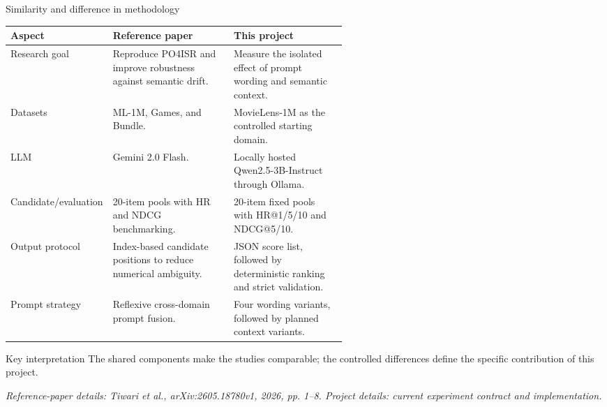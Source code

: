 \documentclass[aspectratio=169,12pt]{beamer}
\newcommand{\source}[1]{\vspace{0.35em}\par{\tiny\color{Muted}\textit{#1}}}
\begin{document}
\begin{frame}{Similarity and difference in methodology}
\scriptsize
\begin{tabularx}{\linewidth}{@{}p{0.20\linewidth}p{0.36\linewidth}X@{}}
\toprule
\textbf{Aspect} & \textbf{Reference paper} & \textbf{This project}\\
\midrule
Research goal & Reproduce PO4ISR and improve robustness against semantic drift. & Measure the isolated effect of prompt wording and semantic context.\\[0.35em]
Datasets & ML-1M, Games, and Bundle. & MovieLens-1M as the controlled starting domain.\\[0.35em]
LLM & Gemini 2.0 Flash. & Locally hosted Qwen2.5-3B-Instruct through Ollama.\\[0.35em]
Candidate/evaluation & 20-item pools with HR and NDCG benchmarking. & 20-item fixed pools with HR@1/5/10 and NDCG@5/10.\\[0.35em]
Output protocol & Index-based candidate positions to reduce numerical ambiguity. & JSON score list, followed by deterministic ranking and strict validation.\\[0.35em]
Prompt strategy & Reflexive cross-domain prompt fusion. & Four wording variants, followed by planned context variants.\\
\bottomrule
\end{tabularx}

\vspace{0.45em}
\begin{block}{Key interpretation}
The shared components make the studies comparable; the controlled differences
define the specific contribution of this project.
\end{block}

\source{Reference-paper details: Tiwari et al., arXiv:2605.18780v1, 2026, pp. 1--8. Project details: current experiment contract and implementation.}
\end{frame}
\end{document}
